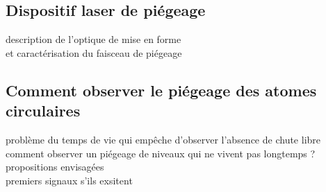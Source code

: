 	\subsection{Dispositif laser de piégeage}
		\noindent description de l'optique de mise en forme \\
		et caractérisation du faisceau de piégeage
	\subsection{Comment observer le piégeage des atomes circulaires}
		\noindent problème du temps de vie qui empêche d'observer l'absence de chute libre \\
		\noindent comment observer un piégeage de niveaux qui ne vivent pas longtemps ? propositions envisagées\\
		premiers signaux s'ils exsitent
